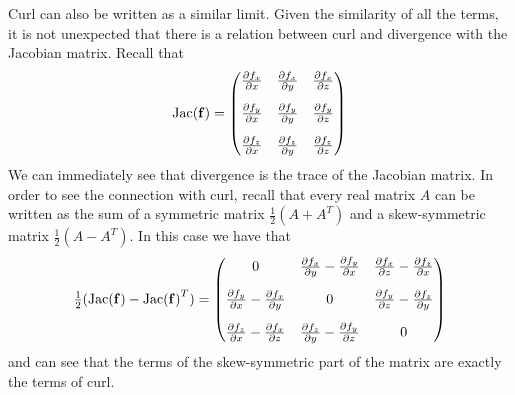 Curl can also be written as a similar limit.
Given the similarity of all the terms, it is not unexpected that there is a relation between curl and divergence with the Jacobian matrix.
Recall that
\[
    \operatorname{Jac}(\mathbf{f}) =
    \begin{pmatrix}
        \frac{\partial f_x}{\partial x}
         & \frac{\partial f_x}{\partial y}
         & \frac{\partial f_x}{\partial z} \\[1em]
        \frac{\partial f_y}{\partial x}
         & \frac{\partial f_y}{\partial y}
         & \frac{\partial f_y}{\partial z} \\[1em]
        \frac{\partial f_z}{\partial x}
         & \frac{\partial f_z}{\partial y}
         & \frac{\partial f_z}{\partial z}
    \end{pmatrix}
\]
We can immediately see that divergence is the trace of the Jacobian matrix.
In order to see the connection with curl, recall that every real matrix \(A\) can be written as the sum of a symmetric matrix \(\frac{1}{2}(A + A^{T})\) and a skew-symmetric matrix \(\frac{1}{2}(A - A^{T})\).
In this case we have that
\[
    \tfrac{1}{2}(\operatorname{Jac}(\mathbf{f}) - {\operatorname{Jac}(\mathbf{f})}^{T}) =
    \begin{pmatrix}
        0
         & \frac{\partial f_x}{\partial y} - \frac{\partial f_y}{\partial x}
         & \frac{\partial f_x}{\partial z} - \frac{\partial f_z}{\partial x}
        \\[1em]
        \frac{\partial f_y}{\partial x} - \frac{\partial f_x}{\partial y}
         & 0
         & \frac{\partial f_y}{\partial z} - \frac{\partial f_z}{\partial y}
        \\[1em]
        \frac{\partial f_z}{\partial x}  - \frac{\partial f_x}{\partial z}
         & \frac{\partial f_z}{\partial y}  - \frac{\partial f_y}{\partial z}
         & 0
    \end{pmatrix}
\]
and can see that the terms of the skew-symmetric part of the matrix are exactly the terms of curl.

\bookletend